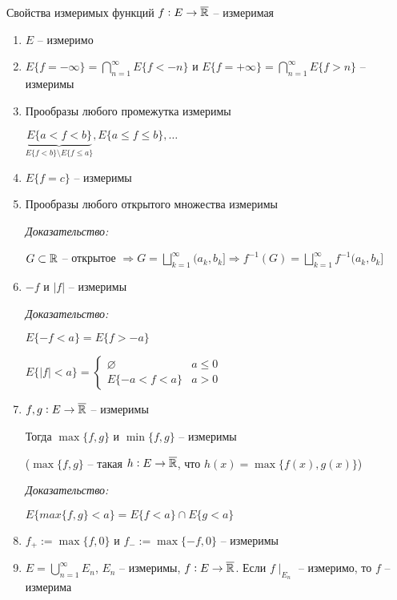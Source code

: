 \documentclass[12pt]{article}
\begin{document}
\begin{theo}{Свойства измеримых функций}
    $f : E \to \overline{\mathbb R}$ -- измеримая 
    \begin{enumerate}
        \item $E$ -- измеримо
        \item $E\{f = - \infty\} = \bigcap\limits_{n = 1}^\infty E\{f < -n\}$ и $E\{f = + \infty\} = \bigcap\limits_{n = 1}^\infty E\{f > n\}$ -- измеримы 
        \item Прообразы любого промежутка измеримы 
        
        $\underbrace{E\{a < f < b\}}_{E\{f < b\} \setminus E\{f \leq a\}}, E\{a \leq f \leq b\}, \ldots$
        \item $E\{f = c\}$ -- измеримы 
        \item Прообразы любого открытого множества измеримы 
        
        \textit{Доказательство:}

        $G \subset \mathbb R$ -- открытое $\Rightarrow G = \bigsqcup\limits_{k = 1}^\infty (a_k, b_k] \Rightarrow f^{-1}(G) = \bigsqcup\limits_{k = 1}^\infty f^{-1}(a_k, b_k]$

        \item $-f$ и $|f|$ -- измеримы
        
        \textit{Доказательство:}

        $E\{-f < a\} = E\{f > -a\}$

        $E\{|f| < a\} = \begin{cases}
            \varnothing & a \leq 0 \\
            E\{-a < f < a\} & a > 0
        \end{cases}$

        \item $f, g : E \to \overline{\mathbb R}$ -- измеримы 
        
        Тогда $\max\{f, g\}$ и $\min\{f, g\}$ -- измеримы 
        
        ($\max\{f, g\}$ -- такая $h : E \to \overline{\mathbb R}$, что $h(x) = \max\{f(x), g(x)\}$)

        \textit{Доказательство:}

        $E\{max\{f, g\} < a\} = E\{f < a\} \cap E\{g < a\}$

        \item $f_+ := \max\{f, 0\}$ и $f_- := \max\{-f, 0\}$ -- измеримы 
        \item $E = \bigcup\limits_{n = 1}^\infty E_n$, $E_n$ -- измеримы, $f : E \to \overline{\mathbb R}$. Если $f\mid_{E_n}$ -- измеримо, то $f$ -- измерима 


\end{enumerate}
\end{theo}
\end{document}
